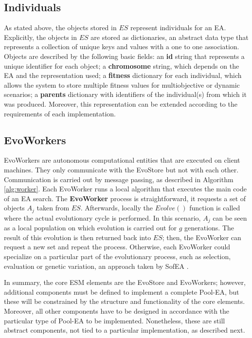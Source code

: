 

\subsection{Individuals}
As stated above, the objects stored in $ES$ represent individuals for an EA. 
Explicitly, the objects in $ES$ are stored as dictionaries, an abstract data type that represents a collection of unique keys and values with a one to one association.
Objects are described by the following basic fields:
an \textbf{id} string that represents a unique identifier for each object;
a \textbf{chromosome} string, which depends on the EA and the representation used;
a \textbf{fitness} dictionary for each individual, which allows the system to store multiple fitness values for multiobjective
or dynamic scenarios; a \textbf{parents} dictionary with identifiers of the individual(s) from which it was produced.
Moreover, this representation can be extended according to the requirements of each implementation. 



\subsection{EvoWorkers}
EvoWorkers are autonomous computational entities that are executed on client machines. They only communicate with the EvoStore but not with each other. Communication is carried out by message passing, as described in Algorithm \ref{alg:worker}. Each EvoWorker runs a local algorithm that executes the main code of an EA search. The \textbf{EvoWorker} process is straightforward, it requests a set of objects $A_j$ taken from $ES$.
Afterwards, locally the $Evolve()$ function is called where the actual evolutionary cycle is performed. In this scenario, $A_j$ can be seen as a local population on which evolution is carried out for $g$ generations. The result of this evolution is then returned back into $ES$; then, the EvoWorker can request a new set and repeat the process. Otherwise, each EvoWorker could specialize on a particular part of the evolutionary process, such as selection, evaluation or genetic variation,
an approach taken by SofEA \cite{sofea1}.

In summary, the core ESM elements are the EvoStore and EvoWorkers; however, additional components must be defined to implement a complete Pool-EA, but these will be constrained by the structure and functionality of the core elements.
Moreover, all other components have to be designed in accordance with the particular type of Pool-EA to be implemented. Nonetheless, these are still abstract components, not tied to a particular implementation, as described next.


